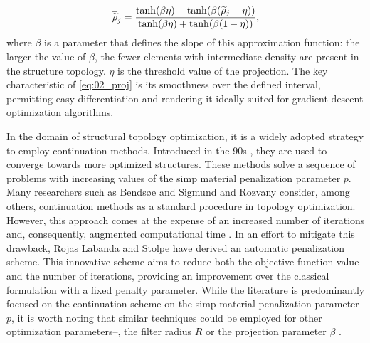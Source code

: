 \begin{equation}
    \overline{\widetilde{\rho}}_j = \frac{\tanh(\beta\eta)+\tanh(\beta(\widetilde{\rho}_j - \eta))}{\tanh(\beta\eta)+\tanh(\beta(1 - \eta))},
    \label{eq:02_proj}
\end{equation}
where $\beta$ is a parameter that defines the slope of this approximation function: the larger the value of $\beta$, the fewer elements with intermediate density are present in the structure topology. $\eta$ is the threshold value of the projection. The key characteristic of \eqref{eq:02_proj} is its smoothness over the defined interval, permitting easy differentiation and rendering it ideally suited for gradient descent optimization algorithms.

In the domain of structural topology optimization, it is a widely adopted strategy to employ continuation methods. Introduced in the 90s , they are used to converge towards more optimized structures. These methods solve a sequence of problems with increasing values of the \gls{simp} material penalization parameter $p$. Many researchers such as Bendsøe and Sigmund  and Rozvany  consider, among others, continuation methods as a standard procedure in topology optimization. However, this approach comes at the expense of an increased number of iterations and, consequently, augmented computational time . In an effort to mitigate this drawback, Rojas Labanda and Stolpe  have derived an automatic penalization scheme. This innovative scheme aims to reduce both the objective function value and the number of iterations, providing an improvement over the classical formulation with a fixed penalty parameter. While the literature is predominantly focused on the continuation scheme on the \gls{simp} material penalization parameter $p$, it is worth noting that similar techniques could be employed for other optimization parameters--\eg, the filter radius $R$ or the projection parameter $\beta$ .

